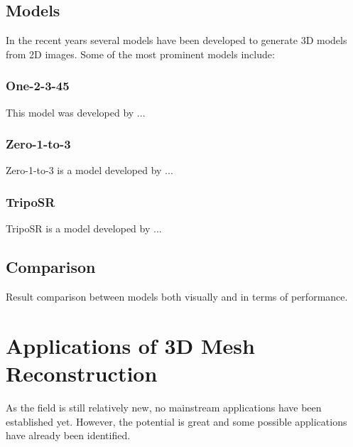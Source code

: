 \subsection{Models}
In the recent years several models have been developed to generate 3D models from 2D images. Some of the most prominent models include:
\subsubsection{One-2-3-45}
This model was developed by \textcite{liu_one-2-3-45_2023-1}...

\subsubsection{Zero-1-to-3}
Zero-1-to-3 is a model developed by \textcite{liu_zero-1--3_2023}...
\subsubsection{TripoSR}
TripoSR is a model developed by \textcite{tochilkin_triposr_2024}...

\subsection{Comparison}
Result comparison between models both visually and in terms of performance.

\section{Applications of 3D Mesh Reconstruction}
As the field is still relatively new, no mainstream applications have been established yet. However, the potential is great and some possible applications have already been identified.

